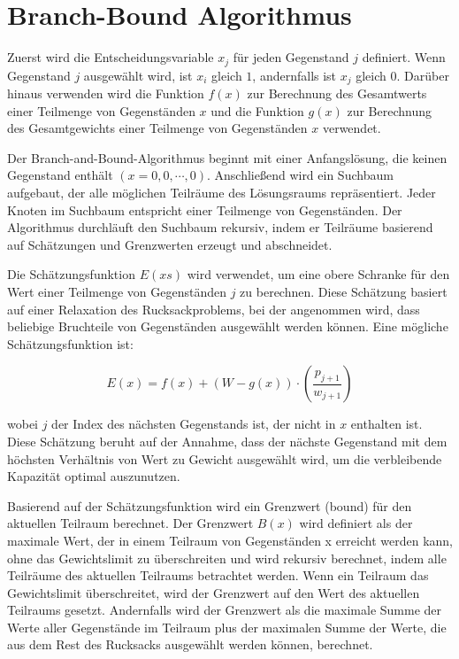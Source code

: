 \section{Branch-Bound Algorithmus}
Zuerst wird die Entscheidungsvariable $x_j$ für jeden 
Gegenstand $j$ definiert. Wenn Gegenstand $j$ ausgewählt wird, ist $x_i$ 
gleich $1$, andernfalls ist $x_j$ gleich $0$. Darüber hinaus 
verwenden wird die Funktion $f(x)$ zur Berechnung des 
Gesamtwerts einer Teilmenge von Gegenständen $x$ und die 
Funktion $g(x)$ zur Berechnung des Gesamtgewichts einer 
Teilmenge von Gegenständen $x$ verwendet.

Der Branch-and-Bound-Algorithmus beginnt mit einer 
Anfangslösung, die keinen Gegenstand enthält 
$(x = {0, 0, \cdots, 0})$. Anschließend wird ein Suchbaum 
aufgebaut, der alle möglichen Teilräume des Lösungsraums 
repräsentiert. Jeder Knoten im Suchbaum entspricht einer 
Teilmenge von Gegenständen. Der Algorithmus durchläuft den 
Suchbaum rekursiv, indem er Teilräume basierend auf 
Schätzungen und Grenzwerten erzeugt und abschneidet.

Die Schätzungsfunktion $E(xs)$ wird verwendet, um eine obere 
Schranke für den Wert einer Teilmenge von Gegenständen $j$ zu 
berechnen. Diese Schätzung basiert auf einer Relaxation des 
Rucksackproblems, bei der angenommen wird, dass beliebige 
Bruchteile von Gegenständen ausgewählt werden können. Eine 
mögliche Schätzungsfunktion ist:

\begin{equation}
    E(x) = f(x) + (W - g(x)) \cdot \left(\frac{p_{j+1}}{w_{j+1}}\right)
\end{equation}

wobei $j$ der Index des nächsten Gegenstands ist, der nicht 
in $x$ enthalten ist. Diese Schätzung beruht auf der Annahme, 
dass der nächste Gegenstand mit dem höchsten Verhältnis von 
Wert zu Gewicht ausgewählt wird, um die verbleibende 
Kapazität optimal auszunutzen.

Basierend auf der Schätzungsfunktion wird ein Grenzwert 
(bound) für den aktuellen Teilraum berechnet. Der Grenzwert 
$B(x)$ wird definiert als der maximale Wert, der in einem 
Teilraum von Gegenständen x erreicht werden kann, ohne das 
Gewichtslimit zu überschreiten und wird 
rekursiv berechnet, indem alle Teilräume des aktuellen 
Teilraums betrachtet werden. Wenn ein Teilraum das 
Gewichtslimit überschreitet, wird der Grenzwert auf den Wert 
des aktuellen Teilraums gesetzt. Andernfalls wird der 
Grenzwert als die maximale Summe der Werte aller Gegenstände 
im Teilraum plus der maximalen Summe der Werte, die aus dem 
Rest des Rucksacks ausgewählt werden können, berechnet.


